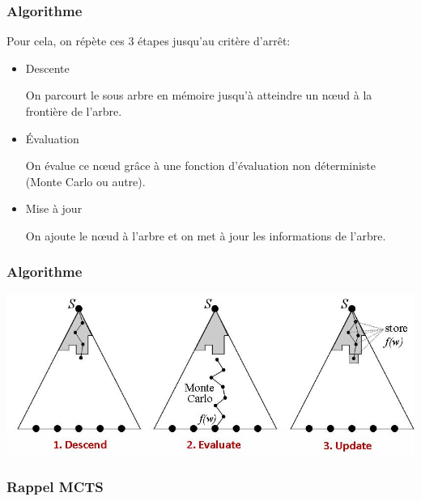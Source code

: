 \documentclass{beamer}
\begin{document}
\begin{frame}
    \frametitle{Algorithme}

    Pour cela, on répète ces 3 étapes jusqu'au critère d'arrêt:
    \begin{itemize}
        \item Descente

            On parcourt le sous arbre en mémoire jusqu'à atteindre un nœud à la frontière de l'arbre.

        \item Évaluation

            On évalue ce nœud grâce à une fonction d'évaluation non déterministe (Monte Carlo ou autre).
        \item Mise à jour

            On ajoute le nœud à l'arbre et on met à jour les informations de l'arbre.
    \end{itemize}


\end{frame}

\begin{frame}
    \frametitle{Algorithme}
    \begin{center}
        \includegraphics[scale=0.5]{3steps.jpg}
    \end{center}


\end{frame}

\begin{frame}
    \frametitle{Rappel MCTS}


\end{frame}
\end{document}
